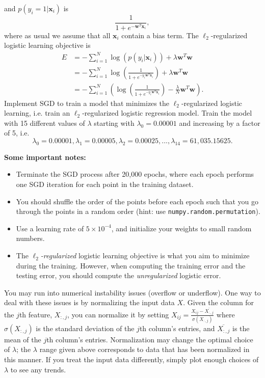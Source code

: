 and $p(y_i = 1 | \mathbf{x}_i)$ is
\[\frac{1}{1 + e^{-\mathbf{w}^T\mathbf{x}_i}},\]
where as usual we assume that all $\mathbf{x}_i$ contain a bias term.
The $\ell_2$-regularized logistic learning objective is 
\begin{align*}
  E &= -\sum_{i=1}^{N}\log(p(y_i | \mathbf{x}_i)) + \lambda\mathbf{w}^T\mathbf{w} \\
    &= -\sum_{i=1}^{N} \log \left( \frac{1}{1 + e^{-y_i\mathbf{w}^T\mathbf{x}_i}} \right) + \lambda\mathbf{w}^T\mathbf{w} \\
    &= -\sum_{i=1}^{N} \left(\log \left( \frac{1}{1 + e^{-y_i\mathbf{w}^T\mathbf{x}_i}} \right) - \frac{\lambda}{N}\mathbf{w}^T\mathbf{w}\right).
\end{align*}
Implement SGD to train a model that minimizes the $\ell_2$-regularized logistic learning, i.e. train an $\ell_2$-regularized logistic regression model.  Train the model with 15 different values of $\lambda$ starting with $\lambda_0 = 0.00001$ and increasing by a factor of 5, i.e. $$\lambda_0 = 0.00001, \lambda_1 = 0.00005, \lambda_2 = 0.00025, ..., \lambda_{14} = 61,035.15625.$$
\par

\textbf{Some important notes:} 
\begin{itemize}
    \item Terminate the SGD process after 20,000 epochs, where each epoch performs one SGD iteration for each point in the training dataset.
    \item You should shuffle the order of the points before each epoch such that you go through the points in a random order (hint: use \texttt{numpy.random.permutation}).
    \item Use a learning rate of $5 \times 10^{-4}$, and initialize your weights to small random numbers. 
    \item The \textit{$\ell_2$-regularized} logistic learning objective is what you aim to minimize during the training. However, when computing the training error and the testing error, you should compute the \textit{unregularized} logistic error. 
\end{itemize}


You may run into numerical instability issues (overflow or underflow). One way to deal with these issues is by normalizing the input data $X$. Given the column for the $j$th feature, $X_{:,j}$, you can normalize it by setting $X_{ij} = \frac{X_{ij} - \overline{X_{:,j}} }{\sigma(X_{:,j})}$ where $\sigma(X_{:,j})$ is the standard deviation of the $j$th column's entries, and $\overline{X_{:,j}}$ is the mean of the $j$th column's entries. Normalization may change the optimal choice of $\lambda$; the $\lambda$ range given above corresponds to data that has been normalized in this manner. If you treat the input data differently, simply plot enough choices of $\lambda$ to see any trends.

